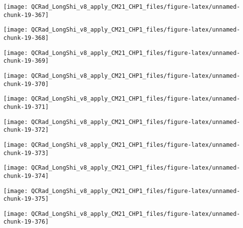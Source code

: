 \documentclass[
  10pt,
  a4paper,oneside]{article}
\begin{document}
\begin{center}\texttt{[image: QCRad\_LongShi\_v8\_apply\_CM21\_CHP1\_files/figure-latex/unnamed-chunk-19-367]} \end{center}

\begin{center}\texttt{[image: QCRad\_LongShi\_v8\_apply\_CM21\_CHP1\_files/figure-latex/unnamed-chunk-19-368]} \end{center}

\begin{center}\texttt{[image: QCRad\_LongShi\_v8\_apply\_CM21\_CHP1\_files/figure-latex/unnamed-chunk-19-369]} \end{center}

\begin{center}\texttt{[image: QCRad\_LongShi\_v8\_apply\_CM21\_CHP1\_files/figure-latex/unnamed-chunk-19-370]} \end{center}

\begin{center}\texttt{[image: QCRad\_LongShi\_v8\_apply\_CM21\_CHP1\_files/figure-latex/unnamed-chunk-19-371]} \end{center}

\begin{center}\texttt{[image: QCRad\_LongShi\_v8\_apply\_CM21\_CHP1\_files/figure-latex/unnamed-chunk-19-372]} \end{center}

\begin{center}\texttt{[image: QCRad\_LongShi\_v8\_apply\_CM21\_CHP1\_files/figure-latex/unnamed-chunk-19-373]} \end{center}

\begin{center}\texttt{[image: QCRad\_LongShi\_v8\_apply\_CM21\_CHP1\_files/figure-latex/unnamed-chunk-19-374]} \end{center}

\begin{center}\texttt{[image: QCRad\_LongShi\_v8\_apply\_CM21\_CHP1\_files/figure-latex/unnamed-chunk-19-375]} \end{center}

\begin{center}\texttt{[image: QCRad\_LongShi\_v8\_apply\_CM21\_CHP1\_files/figure-latex/unnamed-chunk-19-376]} \end{center}
\end{document}
